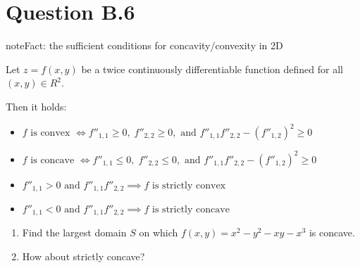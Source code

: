 \documentclass[letterpaper,10pt,english]{jupyterBook}
\begin{document}
\section{Question B.6}
\label{\detokenize{03.exercises:question-b-6}}
\begin{sphinxadmonition}{note}{Fact: the sufficient conditions for concavity/convexity in 2D}

\sphinxAtStartPar
Let \(z = f(x,y)\) be a twice continuously differentiable function defined for all
\((x, y) \in R^2\).

\sphinxAtStartPar
Then it holds:
\begin{itemize}
\item {} 
\sphinxAtStartPar
\(f \text{ is convex } \iff f''_{1,1} \ge 0, \; f''_{2,2} \ge 0 , \text{ and } f''_{1,1} f''_{2,2} − (f''_{1,2})^2 \ge 0\)

\item {} 
\sphinxAtStartPar
\(f \text{ is concave } \iff f''_{1,1} \le 0, \; f''_{2,2} \le 0 , \text{ and } f''_{1,1} f''_{2,2} − (f''_{1,2})^2 \ge 0\)

\item {} 
\sphinxAtStartPar
\(f''_{1,1} > 0 \text{ and } f''_{1,1} f''_{2,2} \implies f \text{ is strictly convex}\)

\item {} 
\sphinxAtStartPar
\(f''_{1,1} < 0 \text{ and } f''_{1,1} f''_{2,2} \implies f \text{ is strictly concave}\)

\end{itemize}
\end{sphinxadmonition}
\begin{enumerate}
%
\item {} 
\sphinxAtStartPar
Find the largest domain \(S\) on which
\(f(x, y) = x^2 − y^2 − xy − x^3\) is concave.

\item {} 
\sphinxAtStartPar
How about strictly concave?

\end{enumerate}







\renewcommand{\indexname}{Index}
\printindex
\end{document}
